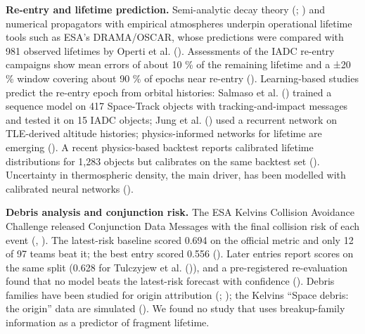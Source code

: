 \documentclass[
]{article}
\begin{document}
\textbf{Re-entry and lifetime prediction.} Semi-analytic decay theory
(;
) and numerical
propagators with empirical atmospheres underpin operational lifetime
tools such as ESA's DRAMA/OSCAR, whose predictions were compared with
981 observed lifetimes by Operti et al.
(). Assessments of the IADC
re-entry campaigns show mean errors of about 10 \% of the remaining
lifetime and a ±20 \% window covering about 90 \% of epochs near
re-entry (). Learning-based studies predict the re-entry epoch from orbital
histories: Salmaso et al. ()
trained a sequence model on 417 Space-Track objects with
tracking-and-impact messages and tested it on 15 IADC objects; Jung et
al. () used a recurrent network on
TLE-derived altitude histories; physics-informed networks for lifetime
are emerging (). A
recent physics-based backtest reports calibrated lifetime distributions
for 1,283 objects but calibrates on the same backtest set
(). Uncertainty
in thermospheric density, the main driver, has been modelled with
calibrated neural networks ().

\textbf{Debris analysis and conjunction risk.} The ESA Kelvins Collision
Avoidance Challenge released Conjunction Data Messages with the final
collision risk of each event (, ). The
latest-risk baseline scored 0.694 on the official metric and only 12 of
97 teams beat it; the best entry scored 0.556
(). Later entries
report scores on the same split (0.628 for Tulczyjew et al.
()), and a pre-registered
re-evaluation found that no model beats the latest-risk forecast with
confidence (). Debris
families have been studied for origin attribution
(;
); the Kelvins
``Space debris: the origin'' data are simulated
().
We found no study that uses breakup-family information as a predictor of
fragment lifetime.
\end{document}

